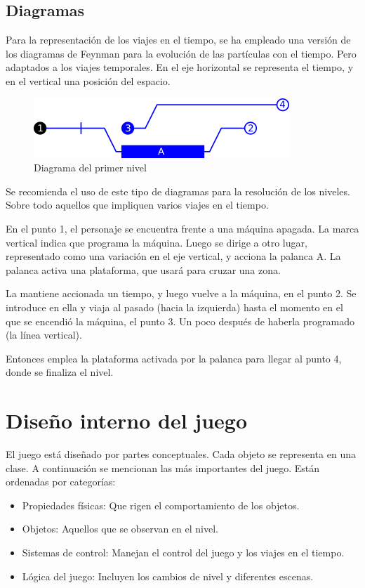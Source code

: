 \documentclass[11pt,a4paper]{article}
\begin{document}
\subsection{Diagramas}

Para la representación de los viajes en el tiempo, se ha empleado una versión de 
los diagramas de Feynman para la evolución de las partículas con el tiempo. Pero 
adaptados a los viajes temporales. En el eje horizontal se representa el tiempo, 
y en el vertical una posición del espacio.

\begin{figure}[htp]
\centering
\includegraphics{cronograma1.png}
\caption{Diagrama del primer nivel}
\label{}
\end{figure}

Se recomienda el uso de este tipo de diagramas para la resolución de los
niveles. Sobre todo aquellos que impliquen varios viajes en el tiempo.

En el punto 1, el personaje se encuentra frente a una máquina apagada. La marca 
vertical indica que programa la máquina. Luego se dirige a otro lugar, 
representado como una variación en el eje vertical, y acciona la palanca A. La 
palanca activa una plataforma, que usará para cruzar una zona.

La mantiene accionada un tiempo, y luego vuelve a la máquina, en el punto 2. Se 
introduce en ella y viaja al pasado (hacia la izquierda) hasta el momento en el 
que se encendió la máquina, el punto 3. Un poco después de haberla programado 
(la línea vertical).

Entonces emplea la plataforma activada por la palanca para llegar al punto 4, 
donde se finaliza el nivel.

\section{Diseño interno del juego}

El juego está diseñado por partes conceptuales. Cada objeto se representa en una 
clase. A continuación se mencionan las más importantes del juego. Están 
ordenadas por categorías:

\begin{itemize}
\item Propiedades físicas: Que rigen el comportamiento de los objetos.
\item Objetos: Aquellos que se observan en el nivel.
\item Sistemas de control: Manejan el control del juego y los viajes en el 
tiempo.
\item Lógica del juego: Incluyen los cambios de nivel y diferentes escenas.
\end{itemize}
\end{document}
